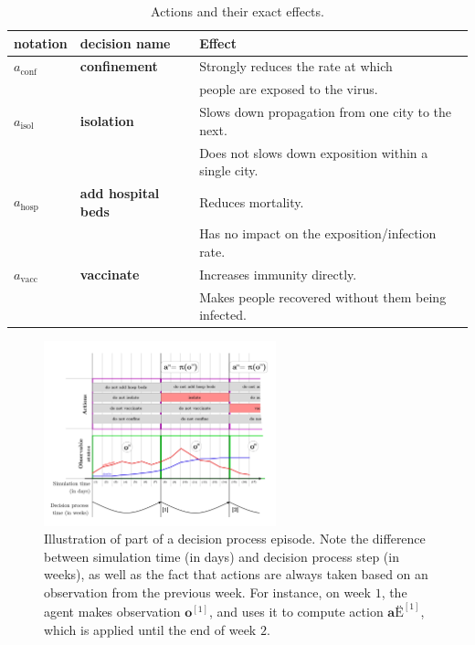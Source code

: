 \documentclass[10pt]{article}
\begin{document}
\begin{table}[ht]
  \begin{center}
    \begin{tabular}{||l | l | l ||} 
     \hline
     notation & decision name & Effect  \\ [0.5ex] 
     \hline\hline
     $a_\text{conf}$ & \textbf{confinement} & Strongly reduces the rate at which  \\ 
      & & people are exposed to the virus.\\
     \hline
     $a_\text{isol}$ & \textbf{isolation} & Slows down propagation from one city to the next.  \\ 
      &  & Does not slows down exposition within a single city. \\ 
     \hline
     $a_\text{hosp}$ & \textbf{add hospital beds} & Reduces mortality. \\ 
      &  & Has no impact on the exposition/infection rate. \\ 
     \hline
     $a_\text{vacc}$ & \textbf{vaccinate} & Increases immunity directly. \\ 
      & &  Makes people recovered without them being infected.  \\ 
     \hline
    \end{tabular}
    \end{center}
    \caption{Actions and their exact effects.}
    \label{table:actions}
\end{table}

\begin{figure}[h!]
    \centering
    \includegraphics[width=0.6\textwidth]{figures/POMDP.png}
    \caption{Illustration of part of a decision process episode. Note the difference between simulation time (in days) and decision process step (in weeks), as well as the fact that actions are always taken based on an observation from the previous week. For instance, on week $1$, the agent makes observation $\mathbf{o}^{[1]}$, and uses it to compute action $\mathbf{aË}^{[1]}$, which is applied until the end of week $2$. }
    \label{fig:pomdp}
\end{figure}
\end{document}
